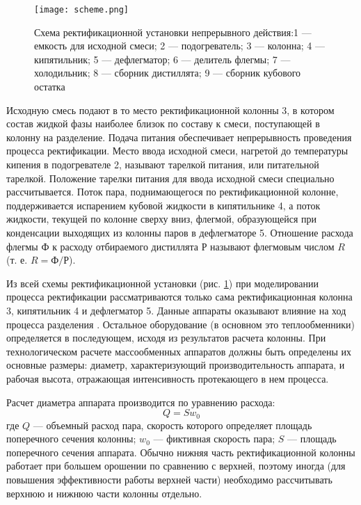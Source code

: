 \begin{figure}[h]
	\begin{center}
		\texttt{[image: scheme.png]}
	\end{center}
	\caption{Схема ректификационной установки непрерывного действия:1 --- емкость для исходной смеси; 2 --- подогреватель; 3 --- колонна; 4 --- кипятильник; 5 --- дефлегматор; 6 --- делитель флегмы; 7 --- холодильник; 8 --- сборник дистиллята; 9 --- сборник кубового остатка} \label{fig:rect.scheme}
\end{figure}


Исходную смесь подают в то место ректификационной колонны 3, в котором состав жидкой фазы наиболее близок по составу к смеси, поступающей в колонну на разделение. Подача питания обеспечивает непрерывность проведения процесса ректификации. Место ввода исходной смеси, нагретой до температуры кипения в подогревателе 2, называют тарелкой питания, или питательной тарелкой. Положение тарелки питания для ввода исходной смеси специально рассчитывается. Поток пара, поднимающегося по ректификационной колонне, поддерживается испарением кубовой жидкости в кипятильнике 4, а поток жидкости, текущей по колонне сверху вниз, флегмой, образующейся при конденсации выходящих из колонны паров в дефлегматоре 5. Отношение расхода флегмы $Ф$ к расходу отбираемого дистиллята $Р$ называют флегмовым числом $R$ (т. е. $R = Ф/Р$).

Из всей схемы ректификационной установки (рис. \ref{fig:rect.scheme}) при моделировании процесса ректификации рассматриваются только сама ректификационная колонна 3, кипятильник 4 и дефлегматор 5. Данные аппараты оказывают влияние на ход процесса разделения \cite{klinov-mm2009}. Остальное оборудование (в основном это теплообменники) определяется в последующем, исходя из результатов расчета колонны. При технологическом расчете массообменных аппаратов должны быть определены их основные размеры: диаметр, характеризующий производительность аппарата, и рабочая высота, отражающая интенсивность протекающего в нем процесса.

Расчет диаметра аппарата производится по уравнению расхода:
\begin{equation}
	Q=S w_0
\end{equation}
где $Q$ --- объемный расход пара, скорость которого определяет площадь поперечного сечения колонны; $w_0$ --- фиктивная скорость пара; $S$ --- площадь поперечного сечения аппарата. Обычно нижняя часть ректификационной колонны работает при большем орошении по сравнению с верхней, поэтому иногда (для повышения эффективности работы верхней части) необходимо рассчитывать верхнюю и нижнюю части колонны отдельно.

